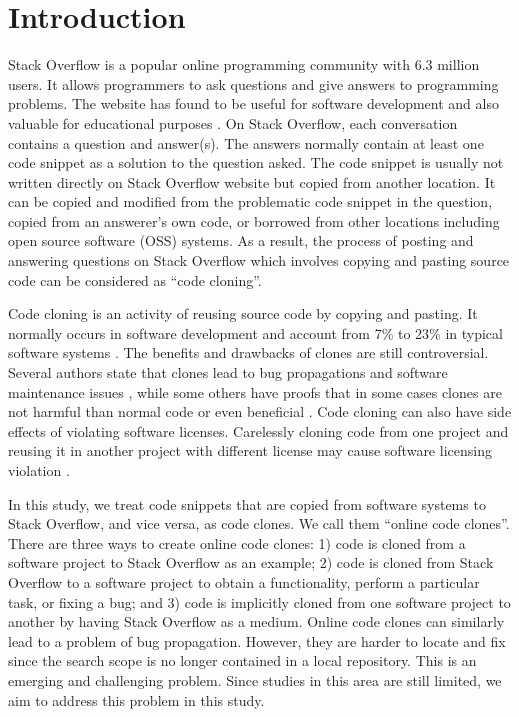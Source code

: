 \documentclass{sig-alternate-05-2015}
\begin{document}
\section{Introduction}
Stack Overflow is a popular online programming community with 6.3 million users. It allows programmers to ask questions and give answers to programming problems. The website has found to be useful for software development and also valuable for educational purposes \cite{x}. On Stack Overflow, each conversation contains a question and answer(s).  The answers normally contain at least one code snippet as a solution to the question asked. The code snippet is usually not written directly on Stack Overflow website but copied from another location. It can be copied and modified from the problematic code snippet in the question, copied from an answerer's own code, or borrowed from other locations including open source software (OSS) systems. As a result, the process of posting and answering questions on Stack Overflow which involves copying and pasting source code can be considered as ``code cloning''. 

Code cloning is an activity of reusing source code by copying and pasting. It normally occurs in software development and account from 7\% to 23\% in typical software systems \cite{Bellon2007}. The benefits and drawbacks of clones are still controversial. Several authors state that clones lead to bug propagations and software maintenance issues \cite{Kamiya2002}, while some others have proofs that in some cases clones are not harmful than normal code or even beneficial \cite{Saini2016,Kapser2006}. Code cloning can also have side effects of violating software licenses. Carelessly cloning code from one project and reusing it in another project with different license may cause software licensing violation \cite{German2009}.

In this study, we treat code snippets that are copied from software systems to Stack Overflow, and vice versa, as code clones. We call them ``online code clones''. There are three ways to create online code clones: 1) code is cloned from a software project to Stack Overflow as an example; 2) code is cloned from Stack Overflow to a software project to obtain a functionality, perform a particular task, or fixing a bug; and 3) code is implicitly cloned from one software project to another by having Stack Overflow as a medium. Online code clones can similarly lead to a problem of bug propagation. However, they are harder to locate and fix since the search scope is no longer contained in a local repository. %
This is an emerging and challenging problem. Since studies in this area are still limited, we aim to address this problem in this study. %
\end{document}
